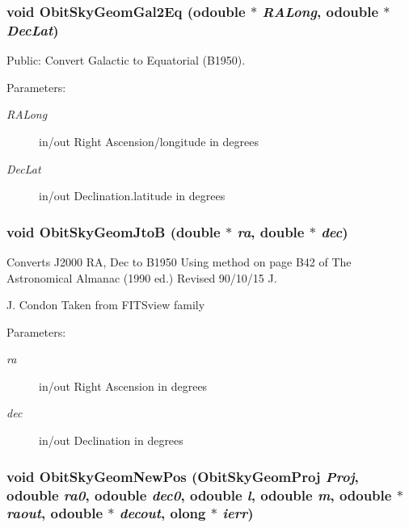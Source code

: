 \subsubsection{\setlength{\rightskip}{0pt plus 5cm}void Obit\-Sky\-Geom\-Gal2Eq ({\bf odouble} $\ast$ {\em RALong}, {\bf odouble} $\ast$ {\em Dec\-Lat})}\label{ObitSkyGeom_8c_a17}


Public: Convert Galactic to Equatorial (B1950). 

\begin{Desc}
\item[Parameters:]
\begin{description}
\item[{\em RALong}]in/out Right Ascension/longitude in degrees \item[{\em Dec\-Lat}]in/out Declination.latitude in degrees \end{description}
\end{Desc}
\subsubsection{\setlength{\rightskip}{0pt plus 5cm}void Obit\-Sky\-Geom\-Jto\-B (double $\ast$ {\em ra}, double $\ast$ {\em dec})}\label{ObitSkyGeom_8c_a15}


Converts J2000 RA, Dec to B1950 Using method on page B42 of The Astronomical Almanac (1990 ed.) Revised 90/10/15 J. 

J. Condon Taken from FITSview family \begin{Desc}
\item[Parameters:]
\begin{description}
\item[{\em ra}]in/out Right Ascension in degrees \item[{\em dec}]in/out Declination in degrees \end{description}
\end{Desc}
\subsubsection{\setlength{\rightskip}{0pt plus 5cm}void Obit\-Sky\-Geom\-New\-Pos (Obit\-Sky\-Geom\-Proj {\em Proj}, {\bf odouble} {\em ra0}, {\bf odouble} {\em dec0}, {\bf odouble} {\em l}, {\bf odouble} {\em m}, {\bf odouble} $\ast$ {\em raout}, {\bf odouble} $\ast$ {\em decout}, {\bf olong} $\ast$ {\em ierr})}\label{ObitSkyGeom_8c_a7}


